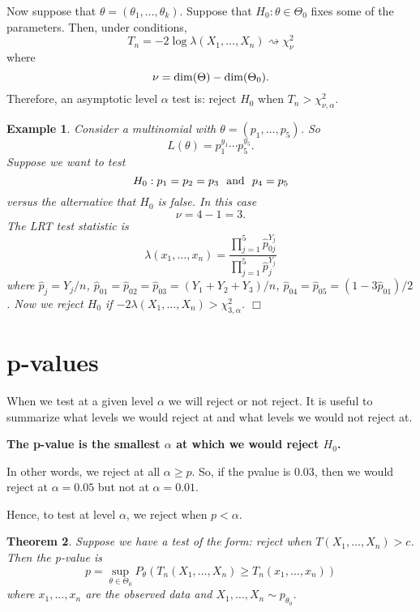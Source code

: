 \documentclass[twoside,12pt]{article}
\newcounter{lecnum}
\newtheorem{theorem}{Theorem}[lecnum]
\newtheorem{example}[theorem]{Example}
\begin{document}
Now suppose that
$\theta=(\theta_1,\ldots, \theta_k)$.
Suppose that $H_0: \theta\in\Theta_0$ fixes some of the parameters.
Then, under conditions,
$$
T_n = -2\log \lambda(X_1,\ldots, X_n) \rightsquigarrow \chi^2_{\nu}
$$
where
$$
\nu = {\rm dim}(\Theta) - {\rm dim}(\Theta_0).
$$
Therefore,
an asymptotic level $\alpha$ test is: reject $H_0$ when
$T_n > \chi^2_{\nu,\alpha}$.


\begin{example}
Consider a multinomial with
$\theta = (p_1,\ldots, p_5)$.
So
$$
L(\theta) = p_1^{y_1}\cdots p_5^{y_5}.
$$
Suppose we want to test
$$
H_0: p_1=p_2=p_3 \ \ {\rm and}\ \ p_4 = p_5
$$
versus the alternative that $H_0$ is false.
In this case
$$
\nu = 4 - 1 = 3.
$$
The LRT test statistic is
$$
\lambda(x_1,\ldots, x_n) =
\frac{ \prod_{j=1}^5 \widehat{p}_{0j}^{Y_j}}{ \prod_{j=1}^5 \widehat{p}_{j}^{Y_j}}
$$
where
$\widehat{p}_j = Y_j/n$,
$\widehat{p}_{01} = \widehat{p}_{02} = \widehat{p}_{03}  = (Y_1+Y_2+Y_3)/n$,
$\widehat{p}_{04} = \widehat{p}_{05} = (1-3\widehat{p}_{01})/2$.
Now we reject $H_0$ if
$-2\lambda (X_1,\ldots, X_n) > \chi^2_{3,\alpha}$. $\Box$
\end{example}


\section{p-values}

When we test at a given level $\alpha$ we will reject
or not reject.
It is useful to summarize what levels we would reject at and what levels we would not reject at.

\vspace{1cm}

\noindent
{\bf The p-value is the smallest $\alpha$ at which we would reject $H_0$.}

\vspace{1cm}

\noindent
In other words, we reject at all $\alpha \geq p$.
So, if the pvalue is 0.03, then
we would reject at $\alpha =0.05$ but not at
$\alpha =0.01$.

Hence, to test at level $\alpha$, we reject when $p < \alpha$.


\begin{theorem}
Suppose we have a test of the form: reject when
$T(X_1,\ldots, X_n) > c$. Then
the p-value is
$$
p = \sup_{\theta\in\Theta_0}P_\theta(T_n(X_1,\ldots, X_n)\geq T_n(x_1,\ldots,x_n))
$$
where $x_1,\ldots, x_n$ are the observed data and
$X_1,\ldots,X_n \sim p_{\theta_0}$.
\end{theorem}
\end{document}
